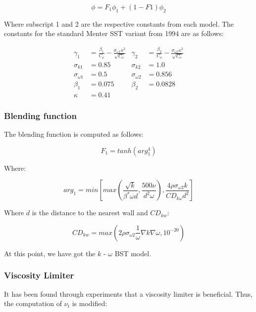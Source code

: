 \begin{equation}
    \phi = F_1 \phi_1 + (1 - F1) \phi_2
\end{equation}

\noindent Where subscript 1 and 2 are the respective constants from each model.
The constants for the standard Menter SST variant from 1994  are as follows:
\cite{nasatmr}

\begin{align*}
    \gamma_1 &= \frac{\beta_1}{C_{\nu}} - 
    \frac{\sigma_{\omega 1} \kappa^2}{\sqrt{C_{\nu}}}
    & \gamma_2 &= \frac{\beta_2}{C_{\nu}} - 
    \frac{\sigma_{\omega 2} \kappa^2}{\sqrt{C_{\nu}}}\\
%
    \sigma_{k 1}        &= 0.85  & \sigma_{k 2}         &= 1.0 \\
    \sigma_{\omega 1}   &= 0.5   & \sigma_{\omega 2}    &= 0.856 \\
    \beta_1             &= 0.075 & \beta_2              &= 0.0828 \\
    \kappa              &= 0.41
\end{align*}


\subsubsection{Blending function}
The blending function is computed as follows:

\begin{equation}
    \label{eq:f1}
    F_1 = tanh(arg_1^4)
\end{equation}

\noindent Where:

\begin{equation}
    \label{eq:arg1}
    arg_1 = min \left[ max \left( 
    \frac{\sqrt{k}}{\beta^{*} \omega d}, \frac{500 \nu}{d^2 \omega}
    \right), 
    \frac{4 \rho \sigma_{\omega 2} k}{CD_{k \omega} d^2}
    \right]
\end{equation}

\noindent Where $d$ is the distance to the nearest wall and $CD_{kw}$:

\begin{equation}
    \label{eq:cdkw}
    CD_{kw} = max \left( 
    2 \rho \sigma_{\omega 2} \frac{1}{\omega} \nabla k \nabla \omega, 10^{-20} 
    \right)
\end{equation}

\noindent At this point, we have got the $k$ - $\omega$ BST model.


\subsubsection{Viscosity Limiter}
 It has been found through experiments that a viscosity limiter is beneficial.
 Thus, the computation of $\nu_t$ is modified:

